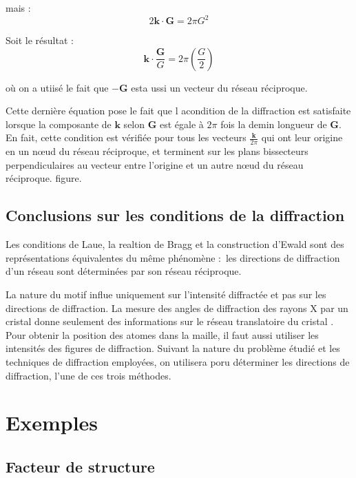 mais :
\begin{equation}
    2 \mathbf{k\cdot G} = 2\pi G^2
\end{equation}

Soit le résultat :
\begin{equation}
    \mathbf{k}\cdot\frac{\mathbf{G}}{G} = 2\pi \left( \frac{G}{2} \right)
\end{equation}

où on a utiisé le fait que $-\mathbf{G}$ esta ussi un vecteur du réseau
réciproque.

Cette dernière équation pose le fait que l acondition de la diffraction est
satisfaite lorsque la composante de $\mathbf{k}$ selon $\mathbf{G}$ est égale à
$2\pi$ fois la demin longueur de $\mathbf{G}$. En fait, cette condition est
vérifiée pour tous les vecteurs $\frac{\mathbf{k}}{2\pi}$ qui ont leur origine
en un nœud du réseau réciproque, et terminent sur les plans bissecteurs
perpendiculaires au vecteur entre l'origine et un autre nœud du réseau réciproque. \TODO figure.


 
\subsection{Conclusions sur les conditions de la diffraction}

Les conditions de Laue, la realtion de Bragg et la construction d'Ewald sont des
représentations équivalentes du même phénomène : les directions de diffraction 
d'un réseau sont déterminées par son réseau réciproque.

La nature du motif influe uniquement sur l'intensité diffractée et pas sur les
directions de diffraction. La mesure des angles de diffraction des rayons X par
un cristal donne seulement des informations sur le réseau translatoire du cristal
. Pour obtenir la position des atomes dans la maille, il faut aussi utiliser les
intensités des figures de diffraction. Suivant la nature du problème étudié et
les techniques de diffraction employées, on utilisera poru déterminer les
directions de diffraction, l'une de ces trois méthodes.

\section{Exemples}

\subsection{Facteur de structure}


